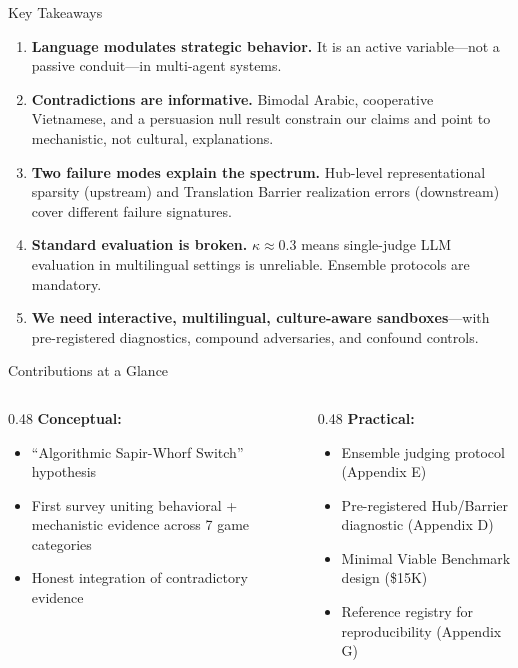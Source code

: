 \documentclass[11pt,aspectratio=169]{beamer}
\begin{document}
\begin{frame}{Key Takeaways}
    \begin{enumerate}
        \item \textbf{Language modulates strategic behavior.} It is an active variable---not a passive conduit---in multi-agent systems.
        \vspace{0.2cm}
        \item \textbf{Contradictions are informative.} Bimodal Arabic, cooperative Vietnamese, and a persuasion null result constrain our claims and point to mechanistic, not cultural, explanations.
        \vspace{0.2cm}
        \item \textbf{Two failure modes explain the spectrum.} Hub-level representational sparsity (upstream) and Translation Barrier realization errors (downstream) cover different failure signatures.
        \vspace{0.2cm}
        \item \textbf{Standard evaluation is broken.} $\kappa \approx 0.3$ means single-judge LLM evaluation in multilingual settings is unreliable. Ensemble protocols are mandatory.
        \vspace{0.2cm}
        \item \textbf{We need interactive, multilingual, culture-aware sandboxes}---with pre-registered diagnostics, compound adversaries, and confound controls.
    \end{enumerate}
\end{frame}

\begin{frame}{Contributions at a Glance}
    \begin{columns}[T]
        \begin{column}{0.48\textwidth}
            \textbf{Conceptual:}
            \begin{itemize}
                \item ``Algorithmic Sapir-Whorf Switch'' hypothesis
                \item First survey uniting behavioral + mechanistic evidence across 7 game categories
                \item Honest integration of contradictory evidence
            \end{itemize}
        \end{column}
        \begin{column}{0.48\textwidth}
            \textbf{Practical:}
            \begin{itemize}
                \item Ensemble judging protocol (Appendix E)
                \item Pre-registered Hub/Barrier diagnostic (Appendix D)
                \item Minimal Viable Benchmark design (\$15K)
                \item Reference registry for reproducibility (Appendix G)
            \end{itemize}
        \end{column}
    \end{columns}
\end{frame}
\end{document}
